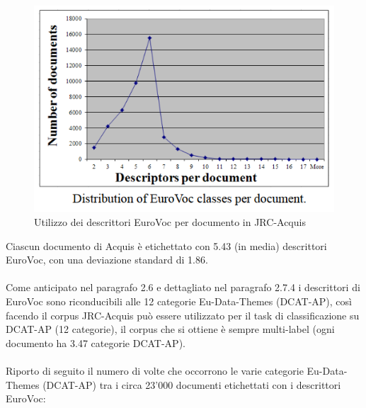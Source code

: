 \documentclass{article}
\theoremstyle{plain}
\theoremstyle{definition}
\begin{document}
\begin{figure}[htbp]
\begin{center}
\includegraphics[scale=1.00]{img/evocdistribution.png}
\caption{Utilizzo dei descrittori EuroVoc per documento in JRC-Acquis}
\end{center}
\end{figure}
Ciascun documento di Acquis è etichettato con 5.43 (in media) descrittori EuroVoc, con una deviazione standard di 1.86.
\footnotemark
{}
\\
\\
Come anticipato nel paragrafo 2.6 e dettagliato nel paragrafo 2.7.4 i descrittori di EuroVoc sono riconducibili alle 12 categorie Eu-Data-Themes (DCAT-AP), così facendo il corpus JRC-Acquis può essere utilizzato per il task di classificazione su DCAT-AP (12 categorie), il corpus che si ottiene è sempre multi-label (ogni documento ha 3.47 categorie DCAT-AP).
\\
\\
Riporto di seguito il numero di volte che occorrono le varie categorie Eu-Data-Themes (DCAT-AP) tra i circa 23'000 documenti etichettati con i descrittori EuroVoc:
\end{document}
